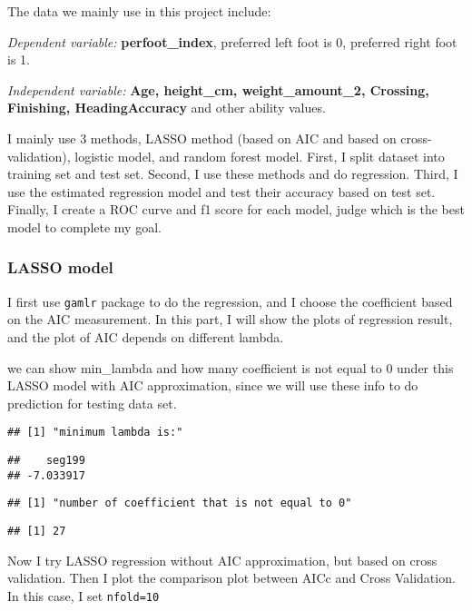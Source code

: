 \documentclass[
]{article}
\begin{document}
The data we mainly use in this project include:

\emph{Dependent variable:} \textbf{perfoot\_index}, preferred left foot
is 0, preferred right foot is 1.

\emph{Independent variable:} \textbf{Age, height\_cm, weight\_amount\_2,
Crossing, Finishing, HeadingAccuracy} and other ability values.

I mainly use 3 methods, LASSO method (based on AIC and based on
cross-validation), logistic model, and random forest model. First, I
split dataset into training set and test set. Second, I use these
methods and do regression. Third, I use the estimated regression model
and test their accuracy based on test set. Finally, I create a ROC curve
and f1 score for each model, judge which is the best model to complete
my goal.

\hypertarget{lasso-model}{%
\subsubsection{LASSO model}\label{lasso-model}}

I first use \texttt{gamlr} package to do the regression, and I choose
the coefficient based on the AIC measurement. In this part, I will show
the plots of regression result, and the plot of AIC depends on different
lambda.

we can show min\_lambda and how many coefficient is not equal to 0 under
this LASSO model with AIC approximation, since we will use these info to
do prediction for testing data set.

\begin{verbatim}
## [1] "minimum lambda is:"
\end{verbatim}

\begin{verbatim}
##    seg199 
## -7.033917
\end{verbatim}

\begin{verbatim}
## [1] "number of coefficient that is not equal to 0"
\end{verbatim}

\begin{verbatim}
## [1] 27
\end{verbatim}

Now I try LASSO regression without AIC approximation, but based on cross
validation. Then I plot the comparison plot between AICc and Cross
Validation. In this case, I set \texttt{nfold=10}
\end{document}

